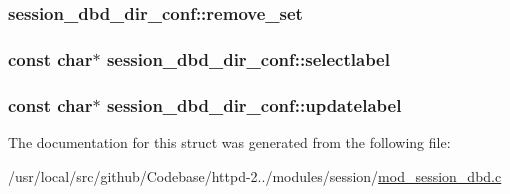 \subsubsection[{\texorpdfstring{remove\+\_\+set}{remove_set}}]{ session\+\_\+dbd\+\_\+dir\+\_\+conf\+::remove\+\_\+set}\hypertarget{structsession__dbd__dir__conf_a24a813e217ddabb5502ff1391a9b7b36}{}\label{structsession__dbd__dir__conf_a24a813e217ddabb5502ff1391a9b7b36}
\subsubsection[{\texorpdfstring{selectlabel}{selectlabel}}]{\setlength{\rightskip}{0pt plus 5cm}const char$\ast$ session\+\_\+dbd\+\_\+dir\+\_\+conf\+::selectlabel}\hypertarget{structsession__dbd__dir__conf_ab0a791b85417d549bc808097016b040a}{}\label{structsession__dbd__dir__conf_ab0a791b85417d549bc808097016b040a}
\subsubsection[{\texorpdfstring{updatelabel}{updatelabel}}]{\setlength{\rightskip}{0pt plus 5cm}const char$\ast$ session\+\_\+dbd\+\_\+dir\+\_\+conf\+::updatelabel}\hypertarget{structsession__dbd__dir__conf_a64c433c4761b4d74c23307277c8e97fc}{}\label{structsession__dbd__dir__conf_a64c433c4761b4d74c23307277c8e97fc}


The documentation for this struct was generated from the following file\+:\begin{DoxyCompactItemize}
\item 
/usr/local/src/github/\+Codebase/httpd-\/2../modules/session/\hyperlink{mod__session__dbd_8c}{mod\+\_\+session\+\_\+dbd.\+c}\end{DoxyCompactItemize}

